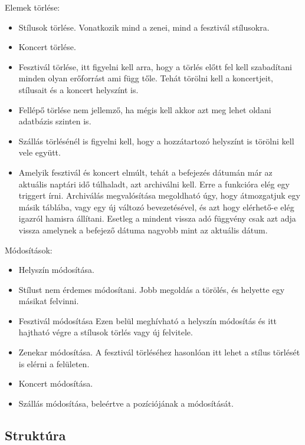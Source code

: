 Elemek törlése:
\begin{itemize}
\item Stílusok törlése. Vonatkozik mind a zenei, mind a fesztivál stílusokra. 
\item Koncert törlése.
\item Fesztivál törlése, itt figyelni kell arra, hogy a törlés előtt fel kell szabadítani minden olyan erőforrást ami függ tőle. Tehát törölni kell a koncertjeit, stílusait és a koncert helyszínt is.
\item Fellépő törlése nem jellemző, ha mégis kell akkor azt meg lehet oldani adatbázis szinten is.
\item Szállás törlésénél is figyelni kell, hogy a hozzátartozó helyszínt is törölni kell vele együtt.
\item Amelyik fesztivál és koncert elmúlt, tehát a befejezés dátumán már az aktuális naptári idő  túlhaladt, azt archiválni kell. Erre a funkcióra elég egy triggert írni. Archiválás megvalósítása megoldható úgy, hogy átmozgatjuk egy másik táblába, vagy egy új változó bevezetésével, és azt hogy elérhető-e elég igazról hamisra állítani. Esetleg a mindent vissza adó függvény csak azt adja vissza amelynek a befejező dátuma nagyobb mint az aktuális dátum.
\end{itemize}
Módosítások:
\begin{itemize}
\item Helyszín módosítása.
\item Stílust nem érdemes módosítani. Jobb megoldás a törölés, és helyette egy másikat felvinni.
\item Fesztivál módosítása Ezen belül meghívható a helyszín módosítás és itt hajtható végre a stílusok törlés vagy új felvitele.
\item Zenekar módosítása. A fesztivál törléséhez hasonlóan itt lehet a stílus törlését is elérni a felületen.
\item Koncert módosítása.
\item Szállás módosítása, beleértve a pozíciójának a módosítását. 
\end{itemize}

\subsection{Struktúra}
